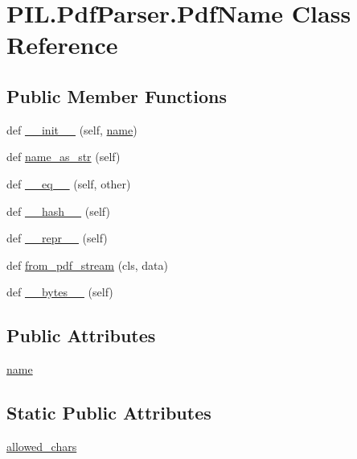 \hypertarget{classPIL_1_1PdfParser_1_1PdfName}{}\section{P\+I\+L.\+Pdf\+Parser.\+Pdf\+Name Class Reference}
\label{classPIL_1_1PdfParser_1_1PdfName}
\subsection*{Public Member Functions}
\begin{DoxyCompactItemize}
\item 
def \hyperlink{classPIL_1_1PdfParser_1_1PdfName_afcfe4c1cab859592429ea28c36c96e31}{\+\_\+\+\_\+init\+\_\+\+\_\+} (self, \hyperlink{classPIL_1_1PdfParser_1_1PdfName_a817e3ec24c9e61bdc4325aac0b684cfe}{name})
\item 
def \hyperlink{classPIL_1_1PdfParser_1_1PdfName_aa710466823262b48ea67d08db4f7d340}{name\+\_\+as\+\_\+str} (self)
\item 
def \hyperlink{classPIL_1_1PdfParser_1_1PdfName_a2ffbc7804c3a8acafdefa4aa04ab279d}{\+\_\+\+\_\+eq\+\_\+\+\_\+} (self, other)
\item 
def \hyperlink{classPIL_1_1PdfParser_1_1PdfName_a0d82d1cf49b38c32fb8cfc091d9c9f31}{\+\_\+\+\_\+hash\+\_\+\+\_\+} (self)
\item 
def \hyperlink{classPIL_1_1PdfParser_1_1PdfName_a3942249e2d4acaba03c21ecedd9e1db6}{\+\_\+\+\_\+repr\+\_\+\+\_\+} (self)
\item 
def \hyperlink{classPIL_1_1PdfParser_1_1PdfName_a089f603d2dc363731a2fb9230008129f}{from\+\_\+pdf\+\_\+stream} (cls, data)
\item 
def \hyperlink{classPIL_1_1PdfParser_1_1PdfName_a332d492b092132a948f232265cdfd7b1}{\+\_\+\+\_\+bytes\+\_\+\+\_\+} (self)
\end{DoxyCompactItemize}
\subsection*{Public Attributes}
\begin{DoxyCompactItemize}
\item 
\hyperlink{classPIL_1_1PdfParser_1_1PdfName_a817e3ec24c9e61bdc4325aac0b684cfe}{name}
\end{DoxyCompactItemize}
\subsection*{Static Public Attributes}
\begin{DoxyCompactItemize}
\item 
\hyperlink{classPIL_1_1PdfParser_1_1PdfName_a146ce01a13c688f111f35e4c6caa5a8e}{allowed\+\_\+chars}
\end{DoxyCompactItemize}


